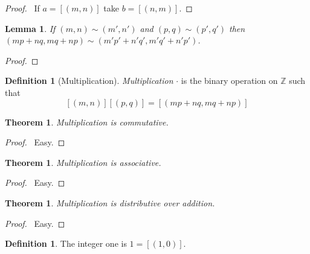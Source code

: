\documentclass{report}
\let\qed\relax
\newtheorem{lemma}[axiom]{Lemma}
\newtheorem{theorem}[axiom]{Theorem}
\theoremstyle{definition}
\newtheorem{definition}[axiom]{Definition}
\begin{document}
    \begin{proof}
        \pf\ If $a = [(m,n)]$ take $b = [(n,m)]$. \qed
    \end{proof}

    \begin{lemma}
        If $(m,n) \sim (m',n')$ and $(p,q) \sim (p',q')$ then $(mp+nq,mq+np) \sim (m'p'+n'q',
        m'q'+n' p')$.
    \end{lemma}

    \begin{proof}
        \pf
        \qed
    \end{proof}

    \begin{definition}[Multiplication]
        \emph{Multiplication} $\cdot$ is the binary operation on $\mathbb{Z}$ such that
        \[ [(m,n)][(p,q)] = [(mp+nq,mq+np)] \]
    \end{definition}

    \begin{theorem}
        Multiplication is commutative.
    \end{theorem}

    \begin{proof}
        \pf\ Easy. \qed
    \end{proof}

    \begin{theorem}
        Multiplication is associative.
    \end{theorem}

    \begin{proof}
        \pf\ Easy. \qed
    \end{proof}

    \begin{theorem}
        Multiplication is distributive over addition.
    \end{theorem}

    \begin{proof}
        \pf\ Easy. \qed
    \end{proof}

    \begin{definition}
        The integer one is $1 = [(1,0)]$.
    \end{definition}
\end{document}
